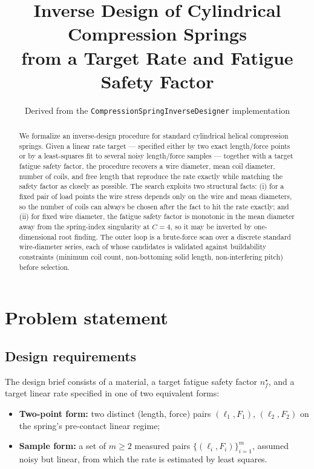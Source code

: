 \documentclass[11pt]{article}
\title{Inverse Design of Cylindrical Compression Springs\\
from a Target Rate and Fatigue Safety Factor}
\author{Derived from the \texttt{CompressionSpringInverseDesigner} implementation}
\date{}
\begin{document}
\maketitle

\begin{abstract}
We formalize an inverse-design procedure for standard cylindrical helical
compression springs. Given a linear rate target — specified either by two
exact length/force points or by a least-squares fit to several noisy
length/force samples — together with a target fatigue safety factor, the
procedure recovers a wire diameter, mean coil diameter, number of coils,
and free length that reproduce the rate exactly while matching the safety
factor as closely as possible. The search exploits two structural facts:
(i) for a fixed pair of load points the wire stress depends only on the
wire and mean diameters, so the number of coils can always be chosen
after the fact to hit the rate exactly; and (ii) for fixed wire diameter,
the fatigue safety factor is monotonic in the mean diameter away from the
spring-index singularity at $C=4$, so it may be inverted by one-dimensional
root finding. The outer loop is a brute-force scan over a discrete
standard wire-diameter series, each of whose candidates is validated
against buildability constraints (minimum coil count, non-bottoming solid
length, non-interfering pitch) before selection.
\end{abstract}

\tableofcontents

\section{Problem statement}

\subsection{Design requirements}

The design brief consists of a material, a target fatigue safety factor
$n_f^{\star}$, and a target linear rate specified in one of two
equivalent forms:

\begin{itemize}
\item \textbf{Two-point form:} two distinct (length, force) pairs
$(\ell_1, F_1)$, $(\ell_2, F_2)$ on the spring's pre-contact linear
regime;
\item \textbf{Sample form:} a set of $m\ge 2$ measured pairs
$\{(\ell_i, F_i)\}_{i=1}^m$, assumed noisy but linear, from which the
rate is estimated by least squares.
\end{itemize}
\end{document}
